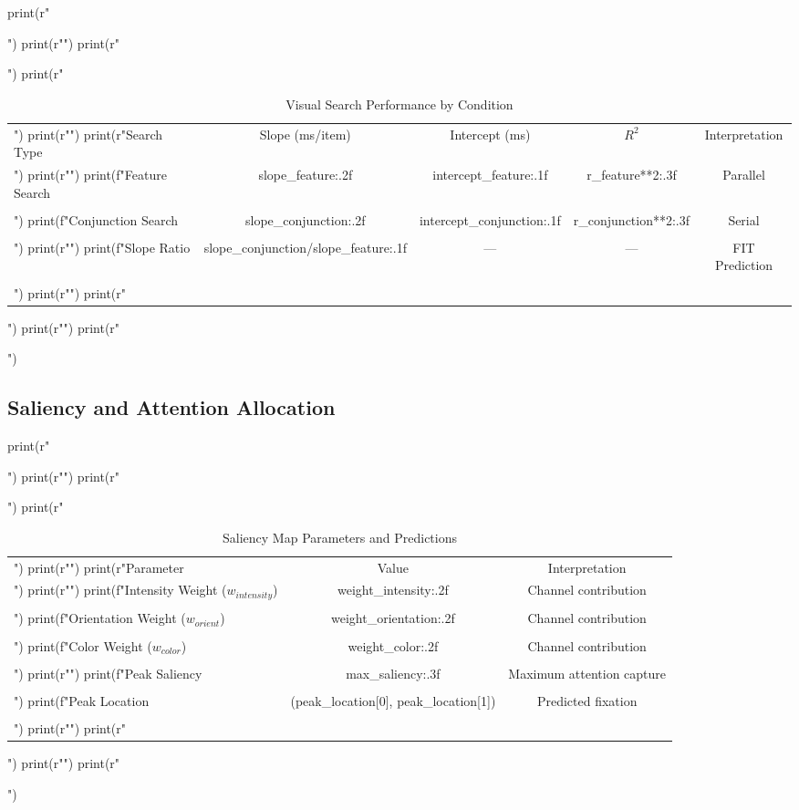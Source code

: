 \documentclass[a4paper, 11pt]{article}
\begin{document}
\begin{pycode}
print(r"\begin{table}[htbp]")
print(r"\centering")
print(r"\caption{Visual Search Performance by Condition}")
print(r"\begin{tabular}{lcccc}")
print(r"\toprule")
print(r"Search Type & Slope (ms/item) & Intercept (ms) & $R^2$ & Interpretation \\")
print(r"\midrule")
print(f"Feature Search & {slope_feature:.2f} & {intercept_feature:.1f} & {r_feature**2:.3f} & Parallel \\\\")
print(f"Conjunction Search & {slope_conjunction:.2f} & {intercept_conjunction:.1f} & {r_conjunction**2:.3f} & Serial \\\\")
print(r"\midrule")
print(f"Slope Ratio & {slope_conjunction/slope_feature:.1f} & --- & --- & FIT Prediction \\\\")
print(r"\bottomrule")
print(r"\end{tabular}")
print(r"\label{tab:visual_search}")
print(r"\end{table}")
\end{pycode}

\subsection{Saliency and Attention Allocation}

\begin{pycode}
print(r"\begin{table}[htbp]")
print(r"\centering")
print(r"\caption{Saliency Map Parameters and Predictions}")
print(r"\begin{tabular}{lcc}")
print(r"\toprule")
print(r"Parameter & Value & Interpretation \\")
print(r"\midrule")
print(f"Intensity Weight ($w_{{intensity}}$) & {weight_intensity:.2f} & Channel contribution \\\\")
print(f"Orientation Weight ($w_{{orient}}$) & {weight_orientation:.2f} & Channel contribution \\\\")
print(f"Color Weight ($w_{{color}}$) & {weight_color:.2f} & Channel contribution \\\\")
print(r"\midrule")
print(f"Peak Saliency & {max_saliency:.3f} & Maximum attention capture \\\\")
print(f"Peak Location & ({peak_location[0]}, {peak_location[1]}) & Predicted fixation \\\\")
print(r"\bottomrule")
print(r"\end{tabular}")
print(r"\label{tab:saliency}")
print(r"\end{table}")
\end{pycode}
\end{document}
